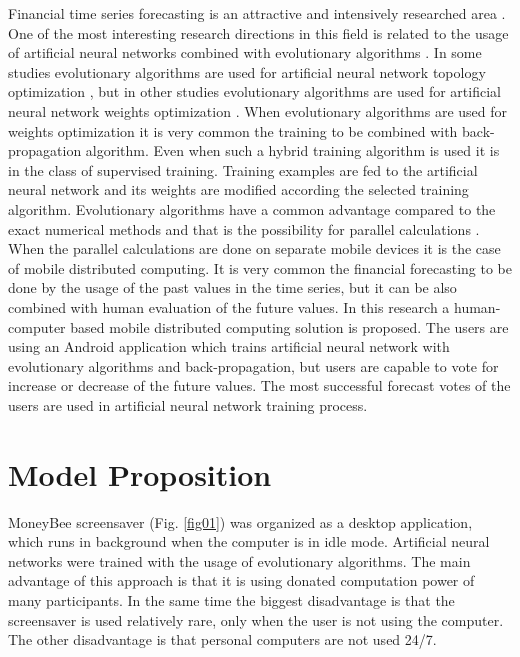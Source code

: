 \documentclass[11pt]{article}
\begin{document}
Financial time series forecasting is an attractive and intensively researched area \cite{nava01}. One of the most interesting research directions in this field is related to the usage of artificial neural networks combined with evolutionary algorithms \cite{zhang01}. In some studies evolutionary algorithms are used for artificial neural network topology optimization \cite{kapanova01}, but in other studies evolutionary algorithms are used for artificial neural network weights optimization \cite{aljarah01}. When evolutionary algorithms are used for weights optimization it is very common the training to be combined with back-propagation algorithm. Even when such a hybrid training algorithm is used it is in the class of supervised training. Training examples are fed to the artificial neural network and its weights are modified according the selected training algorithm. Evolutionary algorithms have a common advantage compared to the exact numerical methods and that is the possibility for parallel calculations \cite{altinoz01}. When the parallel calculations are done on separate mobile devices it is the case of mobile distributed computing. It is very common the financial forecasting to be done by the usage of the past values in the time series, but it can be also combined with human evaluation of the future values. In this research a human-computer based mobile distributed computing solution is proposed. The users are using an Android application which trains artificial neural network with evolutionary algorithms and back-propagation, but users are capable to vote for increase or decrease of the future values. The most successful forecast votes of the users are used in artificial neural network training process.

\section{Model Proposition} \label{Model Proposition}

MoneyBee screensaver (Fig. \ref{fig01}) was organized as a desktop application, which runs in background when the computer is in idle mode. Artificial neural networks were trained with the usage of evolutionary algorithms. The main advantage of this approach is that it is using donated computation power of many participants. In the same time the biggest disadvantage is that the screensaver is used relatively rare, only when the user is not using the computer. The other disadvantage is that personal computers are not used 24/7.
\end{document}
